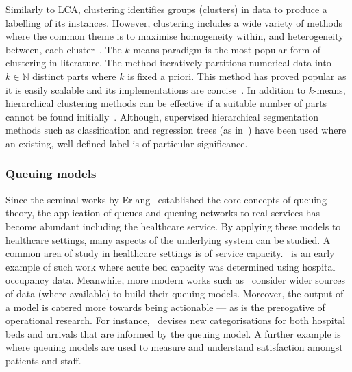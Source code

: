Similarly to LCA, clustering identifies groups (clusters) in data to produce a
labelling of its instances. However, clustering includes a wide variety of
methods where the common theme is to maximise homogeneity within, and
heterogeneity between, each cluster~\cite{Everitt2011}. The \(k\)-means paradigm
is the most popular form of clustering in literature. The method iteratively
partitions numerical data into \(k \in \mathbb{N}\) distinct parts where \(k\)
is fixed a priori. This method has proved popular as it is easily scalable and
its implementations are concise~\cite{Olafsson2008,Wu2009}. In addition to
\(k\)-means, hierarchical clustering methods can be effective if a suitable
number of parts cannot be found initially~\cite{Vuik2016a}. Although, supervised
hierarchical segmentation methods such as classification and regression trees
(as in~\cite{Harper2006}) have been used where an existing, well-defined label
is of particular significance.

\subsubsection{Queuing models}

Since the seminal works by Erlang~\cite{Erlang1917,Erlang1920} established
the core concepts of queuing theory, the application of queues and queuing
networks to real services has become abundant including the healthcare service.
By applying these models to healthcare settings, many aspects of the underlying
system can be studied. A common area of study in healthcare settings is of
service capacity.~\cite{McClain1976} is an early example of such work where
acute bed capacity was determined using hospital occupancy data. Meanwhile, more
modern works such as~\cite{Palvannan2012,Pinto2014} consider wider sources of
data (where available) to build their queuing models. Moreover, the output of
a model is catered more towards being actionable --- as is the prerogative of
operational research. For instance,~\cite{Pinto2014} devises new categorisations
for both hospital beds and arrivals that are informed by the queuing model.
A further example is~\cite{Komashie2015} where queuing models are used to
measure and understand satisfaction amongst patients and staff.

